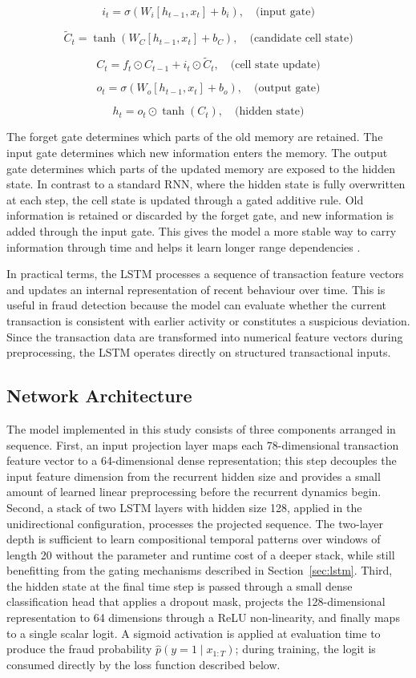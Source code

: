 \documentclass[oneside,12pt,parskip=half,american,numbers=noenddot]{scrreprt}
\begin{document}
\[
i_t = \sigma \left( W_i [h_{t-1}, x_t] + b_i \right), \quad \text{(input gate)}
\]

\[
\tilde{C}_t = \tanh \left( W_C [h_{t-1}, x_t] + b_C \right), \quad \text{(candidate cell state)}
\]

\[
C_t = f_t \odot C_{t-1} + i_t \odot \tilde{C}_t, \quad \text{(cell state update)}
\]

\[
o_t = \sigma \left( W_o [h_{t-1}, x_t] + b_o \right), \quad \text{(output gate)}
\]

\[
h_t = o_t \odot \tanh(C_t), \quad \text{(hidden state)}
\]

The forget gate determines which parts of the old memory are retained. The input gate determines which new information enters the memory. The output gate determines which parts of the updated memory are exposed to the hidden state. In contrast to a standard RNN, where the hidden state is fully overwritten at each step, the cell state is updated through a gated additive rule. Old information is retained or discarded by the forget gate, and new information is added through the input gate. This gives the model a more stable way to carry information through time and helps it learn longer range dependencies \parencite{olah_understanding_2015}.

In practical terms, the LSTM processes a sequence of transaction feature vectors and updates an internal representation of recent behaviour over time. This is useful in fraud detection because the model can evaluate whether the current transaction is consistent with earlier activity or constitutes a suspicious deviation. Since the transaction data are transformed into numerical feature vectors during preprocessing, the LSTM operates directly on structured transactional inputs.

\subsection{Network Architecture}
\label{subsec:lstm_arch}

The model implemented in this study consists of three components arranged in sequence. First, an input projection layer maps each 78-dimensional transaction feature vector to a 64-dimensional dense representation; this step decouples the input feature dimension from the recurrent hidden size and provides a small amount of learned linear preprocessing before the recurrent dynamics begin. Second, a stack of two LSTM layers with hidden size 128, applied in the unidirectional configuration, processes the projected sequence. The two-layer depth is sufficient to learn compositional temporal patterns over windows of length 20 without the parameter and runtime cost of a deeper stack, while still benefitting from the gating mechanisms described in Section~\ref{sec:lstm}. Third, the hidden state at the final time step is passed through a small dense classification head that applies a dropout mask, projects the 128-dimensional representation to 64 dimensions through a ReLU non-linearity, and finally maps to a single scalar logit. A sigmoid activation is applied at evaluation time to produce the fraud probability $\hat{p}(y = 1 \mid x_{1:T})$; during training, the logit is consumed directly by the loss function described below.
\end{document}

